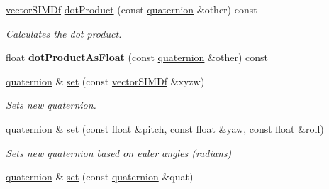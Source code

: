 \begin{DoxyCompactItemize}
\item 
\hyperlink{classirr_1_1core_1_1vectorSIMDf}{vector\+S\+I\+M\+Df} \hyperlink{classirr_1_1core_1_1quaternion_a264ddadb83fa70d5eb4621b25819c2fd}{dot\+Product} (const \hyperlink{classirr_1_1core_1_1quaternion}{quaternion} \&other) const \hypertarget{classirr_1_1core_1_1quaternion_a264ddadb83fa70d5eb4621b25819c2fd}{}\label{classirr_1_1core_1_1quaternion_a264ddadb83fa70d5eb4621b25819c2fd}

\begin{DoxyCompactList}\small\item\em Calculates the dot product. \end{DoxyCompactList}\item 
float {\bfseries dot\+Product\+As\+Float} (const \hyperlink{classirr_1_1core_1_1quaternion}{quaternion} \&other) const \hypertarget{classirr_1_1core_1_1quaternion_a141527d343e8e584cb2970446339d914}{}\label{classirr_1_1core_1_1quaternion_a141527d343e8e584cb2970446339d914}

\item 
\hyperlink{classirr_1_1core_1_1quaternion}{quaternion} \& \hyperlink{classirr_1_1core_1_1quaternion_aa67824ebc8a0ed3986aa58428f89e914}{set} (const \hyperlink{classirr_1_1core_1_1vectorSIMDf}{vector\+S\+I\+M\+Df} \&xyzw)\hypertarget{classirr_1_1core_1_1quaternion_aa67824ebc8a0ed3986aa58428f89e914}{}\label{classirr_1_1core_1_1quaternion_aa67824ebc8a0ed3986aa58428f89e914}

\begin{DoxyCompactList}\small\item\em Sets new quaternion. \end{DoxyCompactList}\item 
\hyperlink{classirr_1_1core_1_1quaternion}{quaternion} \& \hyperlink{classirr_1_1core_1_1quaternion_af82fb45e1cab272f67d92849fd5f55aa}{set} (const float \&pitch, const float \&yaw, const float \&roll)\hypertarget{classirr_1_1core_1_1quaternion_af82fb45e1cab272f67d92849fd5f55aa}{}\label{classirr_1_1core_1_1quaternion_af82fb45e1cab272f67d92849fd5f55aa}

\begin{DoxyCompactList}\small\item\em Sets new quaternion based on euler angles (radians) \end{DoxyCompactList}\item 
\hyperlink{classirr_1_1core_1_1quaternion}{quaternion} \& \hyperlink{classirr_1_1core_1_1quaternion_ab47ecb117abef3c08f72f595e2a64357}{set} (const \hyperlink{classirr_1_1core_1_1quaternion}{quaternion} \&quat)\hypertarget{classirr_1_1core_1_1quaternion_ab47ecb117abef3c08f72f595e2a64357}{}\label{classirr_1_1core_1_1quaternion_ab47ecb117abef3c08f72f595e2a64357}


\end{DoxyCompactItemize}
